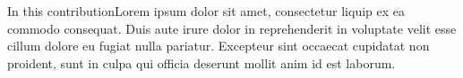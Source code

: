 \documentclass[a0,portrait]{a0poster}
\begin{document}
\begin{minipage}[c]{\linewidth}
\begin{framed}
\begin{multicols}{2}
\begin{center}
\label{IGSMap}
\end{center}
In this contributionLorem ipsum dolor sit amet, consectetur liquip ex ea commodo consequat. Duis aute irure dolor in reprehenderit in voluptate velit esse cillum dolore eu fugiat nulla pariatur. Excepteur sint occaecat cupidatat non proident, sunt in culpa qui officia deserunt mollit anim id est laborum.
\color{Black}

\end{multicols}
\end{framed}
\end{minipage}
\end{document}
